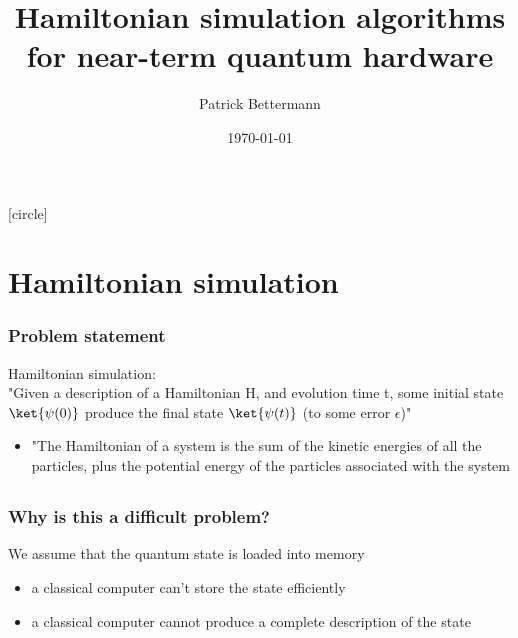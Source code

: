 \documentclass[10pt,a4paper]{beamer}
\title[]{Hamiltonian simulation algorithms for near-term quantum hardware}
\author{Patrick Bettermann}
\date{\today}
\begin{document}
\maketitle
{}[circle]
\frame{\tableofcontents[]}


\section{Hamiltonian simulation}

\begin{frame} %
  \frametitle{Problem statement} 
  \begin{Definition} 
  Hamiltonian simulation: \\
  	"Given a description of a Hamiltonian H, and evolution time t, some initial state $\ket{\psi(0)}$  produce the final state $\ket{\psi(t)}$ (to some error $\epsilon$)"
  \end{Definition}
  \begin{itemize}
 	\item "The Hamiltonian of a system is the sum of the kinetic energies of all the particles, plus the potential energy of the particles associated with the system
	\end{itemize}
\end{frame}

            
\subsection{}
\begin{frame}
  \frametitle{Why is this a difficult problem?} 
  	\begin{Definition}
  	We assume that the quantum state is loaded into memory
	\end{Definition}
\vspace{0.3in}
 \begin{itemize}
 	\item a classical computer can't store the state efficiently
 	\item a classical computer cannot produce a complete description of the state
 	\end{itemize}
\end{frame}
\end{document}
